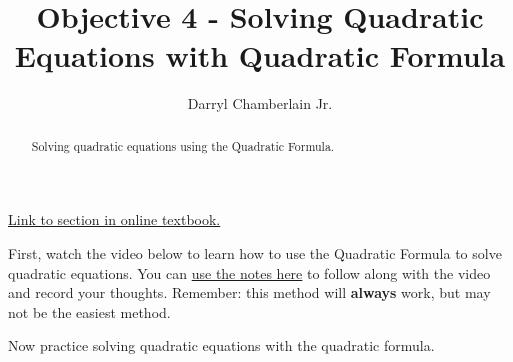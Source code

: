 \documentclass{ximera}
\author{Darryl Chamberlain Jr.}
\title{Objective 4 - Solving Quadratic Equations with Quadratic Formula}
\begin{document}
\begin{abstract}
Solving quadratic equations using the Quadratic Formula.
\end{abstract}
\maketitle

\href{https://cnx.org/contents/mwjClAV_@8.1:-Sm9he1Q@17/Quadratic-Functions}{Link to section in online textbook.}


First, watch the video below to learn how to use the Quadratic Formula to solve quadratic equations. You can \href{http://people.clas.ufl.edu/dchamberlain31/files/M4-Objective-4-Solving-Quadratics-with-Quadratic-Equation.pdf}{use the notes here} to follow along with the video and record your thoughts. Remember: this method will \textbf{always} work, but may not be the easiest method.


Now practice solving quadratic equations with the quadratic formula. 
\end{document}
